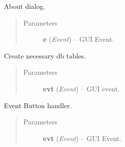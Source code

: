 \documentclass[letterpaper,10pt,english]{sphinxmanual}
\begin{document}
\begin{fulllineitems}
\begin{fulllineitems}
\begin{quote}
\begin{description}
\end{description}\end{quote}

\end{fulllineitems}


\begin{fulllineitems}
\label{wos:wos.GUI.OnAboutBox}
About dialog.
\begin{quote}\begin{description}
\item[{Parameters}] \leavevmode
\textbf{e} (\emph{Event}) -- GUI Event.

\end{description}\end{quote}

\end{fulllineitems}


\begin{fulllineitems}
\label{wos:wos.GUI.OnCreateTables}
Create necessary db tables.
\begin{quote}\begin{description}
\item[{Parameters}] \leavevmode
\textbf{evt} (\emph{Event}) -- GUI event.

\end{description}\end{quote}

\end{fulllineitems}


\begin{fulllineitems}
\label{wos:wos.GUI.OnEvtBtn}
Event Button handler.
\begin{quote}\begin{description}
\item[{Parameters}] \leavevmode
\textbf{evt} (\emph{Event}) -- GUI Event.

\end{description}\end{quote}

\end{fulllineitems}


\end{fulllineitems}
\end{document}
